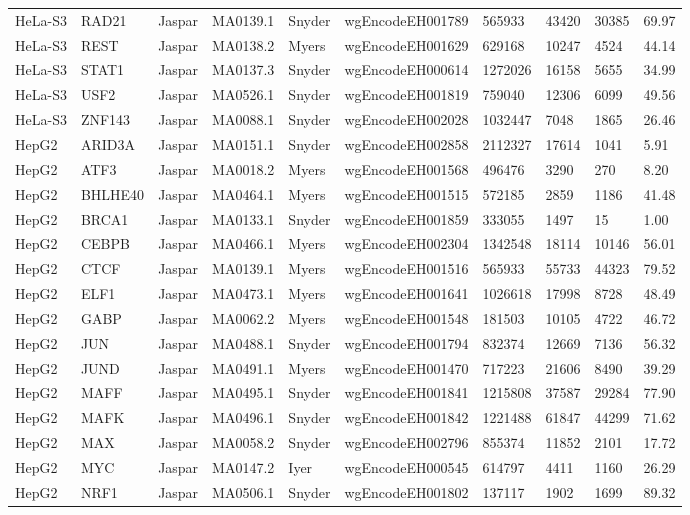 {\begin{longtable}{p{1.1cm}p{1.0cm}p{1.0cm}p{1.0cm}p{1.0cm}p{2.3cm}p{1.0cm}p{0.8cm}p{0.8cm}p{0.8cm}}
HeLa-S3 & RAD21 & Jaspar & MA0139.1 & Snyder & wgEncodeEH001789 & 565933 & 43420 & 30385 & 69.97\\
HeLa-S3 & REST & Jaspar & MA0138.2 & Myers & wgEncodeEH001629 & 629168 & 10247 & 4524 & 44.14\\
HeLa-S3 & STAT1 & Jaspar & MA0137.3 & Snyder & wgEncodeEH000614 & 1272026 & 16158 & 5655 & 34.99\\
HeLa-S3 & USF2 & Jaspar & MA0526.1 & Snyder & wgEncodeEH001819 & 759040 & 12306 & 6099 & 49.56\\
HeLa-S3 & ZNF143 & Jaspar & MA0088.1 & Snyder & wgEncodeEH002028 & 1032447 & 7048 & 1865 & 26.46\\
HepG2 & ARID3A & Jaspar & MA0151.1 & Snyder & wgEncodeEH002858 & 2112327 & 17614 & 1041 & 5.91\\
HepG2 & ATF3 & Jaspar & MA0018.2 & Myers & wgEncodeEH001568 & 496476 & 3290 & 270 & 8.20\\
HepG2 & BHLHE40 & Jaspar & MA0464.1 & Myers & wgEncodeEH001515 & 572185 & 2859 & 1186 & 41.48\\
HepG2 & BRCA1 & Jaspar & MA0133.1 & Snyder & wgEncodeEH001859 & 333055 & 1497 & 15 & 1.00\\
HepG2 & CEBPB & Jaspar & MA0466.1 & Myers & wgEncodeEH002304 & 1342548 & 18114 & 10146 & 56.01\\
HepG2 & CTCF & Jaspar & MA0139.1 & Myers & wgEncodeEH001516 & 565933 & 55733 & 44323 & 79.52\\
HepG2 & ELF1 & Jaspar & MA0473.1 & Myers & wgEncodeEH001641 & 1026618 & 17998 & 8728 & 48.49\\
HepG2 & GABP & Jaspar & MA0062.2 & Myers & wgEncodeEH001548 & 181503 & 10105 & 4722 & 46.72\\
HepG2 & JUN & Jaspar & MA0488.1 & Snyder & wgEncodeEH001794 & 832374 & 12669 & 7136 & 56.32\\
HepG2 & JUND & Jaspar & MA0491.1 & Myers & wgEncodeEH001470 & 717223 & 21606 & 8490 & 39.29\\
HepG2 & MAFF & Jaspar & MA0495.1 & Snyder & wgEncodeEH001841 & 1215808 & 37587 & 29284 & 77.90\\
HepG2 & MAFK & Jaspar & MA0496.1 & Snyder & wgEncodeEH001842 & 1221488 & 61847 & 44299 & 71.62\\
HepG2 & MAX & Jaspar & MA0058.2 & Snyder & wgEncodeEH002796 & 855374 & 11852 & 2101 & 17.72\\
HepG2 & MYC & Jaspar & MA0147.2 & Iyer & wgEncodeEH000545 & 614797 & 4411 & 1160 & 26.29\\
HepG2 & NRF1 & Jaspar & MA0506.1 & Snyder & wgEncodeEH001802 & 137117 & 1902 & 1699 & 89.32\\

\end{longtable}}
